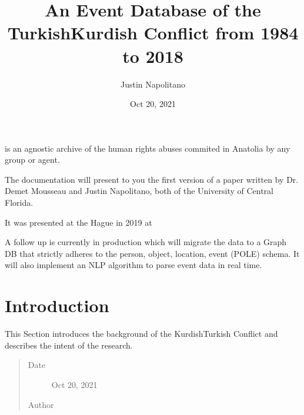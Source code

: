 \documentclass[letterpaper,10pt,english]{sphinxmanual}
\title{An Event Database of the Turkish\sphinxhyphen{}Kurdish Conflict from 1984 to 2018}
\date{Oct 20, 2021}
\author{Justin Napolitano}
\begin{document}
\pagestyle{empty}
\sphinxmaketitle
\pagestyle{plain}
\sphinxtableofcontents
\pagestyle{normal}
\label{\detokenize{index::doc}}
\begin{sphinxShadowBox}

\sphinxAtStartPar
{} is an agnostic archive of the human rights abuses commited in Anatolia by any group or agent.
\end{sphinxShadowBox}

\sphinxAtStartPar
The documentation will present to you the first version of a paper written by Dr. Demet Mousseau and Justin Napolitano, both of the University of Central Florida.

\sphinxAtStartPar
It was presented at the Hague in 2019 at 

\sphinxAtStartPar
A follow up is currently in production which will migrate the data to a Graph DB that strictly adheres to the person, object, location, event (POLE) schema.  It will also implement an NLP algorithm to parse event data in real time.




\chapter{Introduction}
\label{\detokenize{introduction:introduction}}\label{\detokenize{introduction:id1}}\label{\detokenize{introduction::doc}}
\begin{sphinxShadowBox}

\sphinxAtStartPar
This Section introduces the background of the Kurdish\sphinxhyphen{}Turkish Conflict and describes the intent of the research.
\begin{quote}\begin{description}
\item[{Date}] \leavevmode
\sphinxAtStartPar
Oct 20, 2021

\item[{Author}] \leavevmode
\sphinxAtStartPar
{}

\end{description}\end{quote}
\end{sphinxShadowBox}
\end{document}

